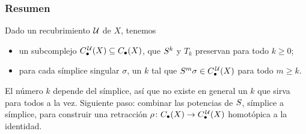 \begin{frame}
  \frametitle{Resumen}

  Dado un recubrimiento $\mathcal{U}$ de $X$, tenemos
  \begin{itemize}
    \item un subcomplejo $C^{\mkern2mu\mathcal{U}}_\bullet(X)\subseteq C_\bullet(X)$, que
      $S^k$ y $T_k$ preservan para todo $k\geq0$;
    \item para cada símplice singular $\sigma$, un $k$ tal que
      $S^m\sigma\in C^{\mkern2mu\mathcal{U}}_\bullet(X)$ para todo $m\geq k$.
  \end{itemize}

  \medskip

  El número $k$ depende del símplice, así que no existe en general un
  $k$ que sirva para todos a la vez. Siguiente paso: combinar las potencias
  de $S$, símplice a símplice, para construir una retracción
  $\rho\colon C_\bullet(X)\to C^{\mkern2mu\mathcal{U}}_\bullet(X)$ homotópica a la identidad.
\end{frame}
